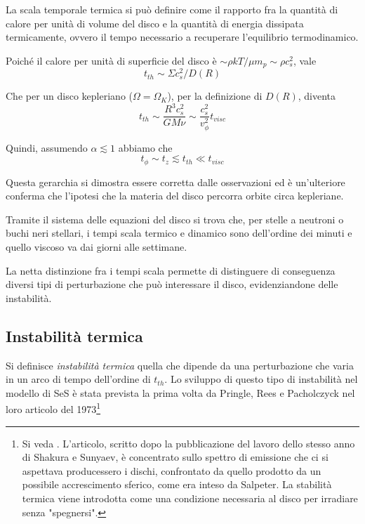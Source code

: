 \documentclass[a4paperbi]{article}
\begin{document}
	La scala temporale termica si può definire come il rapporto fra la quantità di calore per unità di volume del disco e la quantità di energia dissipata termicamente, ovvero il tempo necessario a recuperare l'equilibrio termodinamico.
	
	Poiché il calore per unità di superficie del disco è $\sim\rho kT/\mu m_p\sim\rho c_s^2$, vale
	\begin{equation*}
		t_{th}\sim\Sigma c_s^2/D(R)
	\end{equation*}
	
	Che per un disco kepleriano ($\Omega=\Omega_K$), per la definizione di $D(R)$, diventa
	\begin{equation}
		t_{th}\sim\frac{R^3c_s^2}{GM\nu}\sim\frac{c_s^2}{v_\phi^2}t_{visc}
	\end{equation}
	
	Quindi, assumendo $\alpha\lesssim1$ abbiamo che
	\begin{equation}
		t_\phi\sim t_z\lesssim t_{th}\ll t_{visc}	
	\end{equation}

	Questa gerarchia si dimostra essere corretta dalle osservazioni ed è un'ulteriore conferma che l'ipotesi che la materia del disco percorra orbite circa kepleriane.

	Tramite il sistema delle equazioni del disco si trova che, per stelle a neutroni o buchi neri stellari, i tempi scala termico e dinamico sono dell'ordine dei minuti e quello viscoso va dai giorni alle settimane.

	La netta distinzione fra i tempi scala permette di distinguere di conseguenza diversi tipi di perturbazione che può interessare il disco, evidenziandone delle instabilità.
	
\subsection{Instabilità termica}
	
	Si definisce \textit{instabilità termica} quella che dipende da una perturbazione che varia in un arco di tempo dell'ordine di $t_{th}$. Lo sviluppo di questo tipo di instabilità nel modello di SeS è stata prevista la prima volta da Pringle, Rees e Pacholczyck nel loro articolo del 1973\footnote{Si veda \cite{PringleReesPacholczyk1973}. L'articolo, scritto dopo la pubblicazione del lavoro dello stesso anno di Shakura e Sunyaev, è concentrato sullo spettro di emissione che ci si aspettava producessero i dischi, confrontato da quello prodotto da un possibile accrescimento sferico, come era inteso da Salpeter. La stabilità termica viene introdotta come una condizione necessaria al disco per irradiare senza "spegnersi".}
\end{document}
